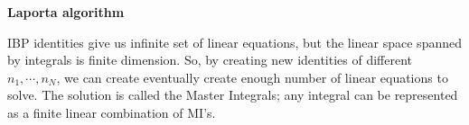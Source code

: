 \documentclass[10pt]{article}
\begin{document}
\textbf{Laporta algorithm}

IBP identities give us infinite set of linear equations, but the linear space spanned by integrals is finite dimension.
So, by creating new identities of different $n_1, \cdots, n_N$, we can create eventually create enough number of linear equations to solve.
The solution is called the Master Integrals; any integral can be represented as a finite linear combination of MI's.
\end{document}
